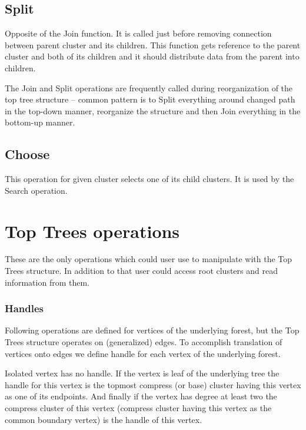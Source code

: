 \subsection{Split}

Opposite of the Join function. It is called just before removing connection
between parent cluster and its children. This function gets reference to the
parent cluster and both of its children and it should distribute data from the
parent into children.

The Join and Split operations are frequently called during reorganization of the
top tree structure -- common pattern is to Split everything around changed path
in the top-down manner, reorganize the structure and then Join everything in the
bottom-up manner.

\subsection{Choose}

This operation for given cluster selects one of its child clusters. It is used
by the {\I Search} operation.



\section{Top Trees operations}

These are the only operations which could user use to manipulate with the Top
Trees structure. In addition to that user could access root clusters and read
information from them.

\subsubsection{Handles}

Following operations are defined for vertices of the underlying forest, but the
Top Trees structure operates on (generalized) edges. To accomplish translation
of vertices onto edges we define {\I handle} for each vertex of the underlying
forest.

Isolated vertex has no handle. If the vertex is leaf of the underlying tree the
handle for this vertex is the topmost compress (or base) cluster having this
vertex as one of its endpoints. And finally if the vertex has degree at least
two the compress cluster of this vertex (compress cluster having this vertex
as the common boundary vertex) is the handle of this vertex.

